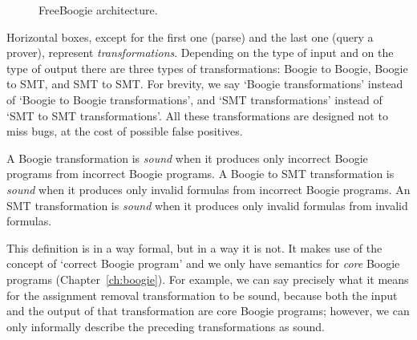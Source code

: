 \documentclass{llncs}
\begin{document}
\begin{figure}
  \centering
  \caption{FreeBoogie architecture.}
  \label{fig:architecture}
\end{figure}

Horizontal boxes, except for the first one (parse) and the last
one (query a prover), represent \emph{transformations}. Depending
on the type of input and on the type of output there are three
types of transformations: Boogie to Boogie, Boogie to SMT, and
SMT to SMT\null. For brevity, we say `Boogie transformations'
instead of `Boogie to Boogie transformations', and `SMT
transformations' instead of `SMT to SMT transformations'. All
these transformations are designed not to miss bugs, at the cost
of possible false positives.

\begin{definition}
A Boogie transformation is \emph{sound} when it produces only
incorrect Boogie programs from incorrect Boogie programs. A
Boogie to SMT transformation is \emph{sound} when it produces
only invalid formulas from incorrect Boogie programs. An SMT
transformation is \emph{sound} when it produces only invalid
formulas from invalid formulas.
\label{def:sound-transform}
\end{definition}

\begin{remark}
This definition is in a way formal, but in a way it is not.
It makes use of the concept of `correct Boogie program'
and we only have semantics for \emph{core} Boogie programs
(Chapter~\ref{ch:boogie}). For example, we can say precisely what
it means for the assignment removal transformation to be sound,
because both the input and the output of that transformation are
core Boogie programs; however, we can only informally describe
the preceding transformations as sound.
\end{remark}
\end{document}
